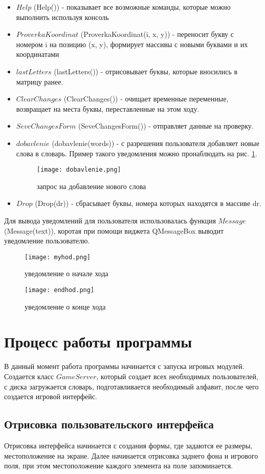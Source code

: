 \documentclass[a4paper,14pt]{article}
\begin{document}
	\begin {itemize}
	\item $Help$ (Help()) - показывает все возможные команды, которые можно выполнить используя консоль
	\item $ProverkaKoordinat$ (ProverkaKoordinat(i, x, y)) - переносит букву с номером i на позицию (x, y), формирует массивы с новыми буквами и их координатами	
	\item $lastLetters$ (lastLetters()) - отрисовывает буквы, которые вносились в матрицу ранее.
	\item $ClearChanges$ (ClearChanges()) - очищает временные переменные, возвращает на места буквы, переставленные на этом ходу.
	\item $SeveChangesForm$ (SeveChangesForm()) - отправляет данные на проверку.
	\item $dobavlenie$ (dobavlenie(words)) - с разрешения пользователя добавляет новые слова в словарь. Пример такого уведомления можно пронаблюдать на рис. \ref{img:dob}.
	\begin{figure}[bhtp]
		\centering
		\caption{запрос на добавление нового слова}
		\texttt{[image: dobavlenie.png]}\label{img:dob}
	\end{figure}
	\item $Drop$ (Drop(dr)) - сбрасывает буквы, номера которых находятся в массиве dr.
	\end {itemize}
	
	Для вывода уведомлений для пользователя использовалась функция $Message$ (Message(text)), коротая при помощи виджета QMessageBox выводит уведомление пользователю.
	\begin{figure}[H]
		\centering
		\caption{уведомление о начале хода}
		\texttt{[image: myhod.png]}
	\end{figure}
	\begin{figure}[H]
		\centering
		\caption{уведомление о конце хода}
		\texttt{[image: endhod.png]}
	\end{figure}


\section{Процесс работы программы}
	В данный момент работа программы начинается с запуска игровых модулей. Создается класс $GameServer$, который создает всех необходимых пользователей, с диска загружается словарь, подготавливается необходимый алфавит, после чего создается игровой интерфейс.

	\subsection[Отрисовка интерфейса]{Отрисовка пользовательского интерфейса}
	Отрисовка интерфейса начинается с создания формы, где задаются ее размеры, местоположение на экране. Далее начинается отрисовка заднего фона и игрового поля, при этом местоположение каждого элемента на поле запоминается.
		
\end{document}
